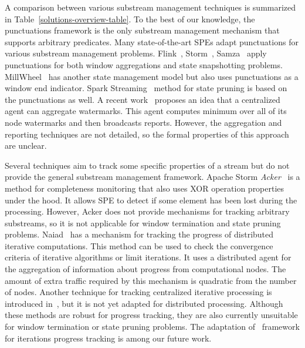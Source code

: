 \label {fs-acker-related}

A comparison between various substream management techniques is summarized in Table~\ref{solutions-overview-table}. To the best of our knowledge, the punctuations framework is the only substream management mechanism that supports arbitrary predicates. Many state-of-the-art SPEs adapt punctuations for various substream management problems. Flink~\cite{Carbone:2017:SMA:3137765.3137777}, Storm~\cite{Toshniwal:2014:STO:2588555.2595641}, Samza~\cite{Noghabi:2017:SSS:3137765.3137770} apply punctuations for both window aggregations and state snapshotting problems. MillWheel~\cite{Akidau:2013:MFS:2536222.2536229} has another state management model but also uses punctuations as a window end indicator. Spark Streaming~\cite{Zaharia:2012:DSE:2342763.2342773} method for state pruning is based on the punctuations as well. A recent work~\cite{DBLP:journals/pvldb/BegoliACHKKMS21} proposes an idea that a centralized agent can aggregate watermarks. This agent computes minimum over all of its node watermarks and then broadcasts reports. However, the aggregation and reporting techniques are not detailed, so the formal properties of this approach are unclear. 

Several techniques aim to track some specific properties of a stream but do not provide the general substream management framework. Apache Storm {\em Acker}~\cite{apache:storm:acker} is a method for completeness monitoring that also uses XOR operation properties under the hood. It allows SPE to detect if some element has been lost during the processing. However, Acker does not provide mechanisms for tracking arbitrary substreams, so it is not applicable for window termination and state pruning problems. Naiad~\cite{Murray:2013:NTD:2517349.2522738} has a mechanism for tracking the progress of distributed iterative computations. This method can be used to check the convergence criteria of iterative algorithms or limit iterations. It uses a distributed agent for the aggregation of information about progress from computational nodes. The amount of extra traffic required by this mechanism is quadratic from the number of nodes. Another technique for tracking centralized iterative processing is introduced in~\cite{chandramouli2014trill}, but it is not yet adapted for distributed processing. Although these methods are robust for progress tracking, they are also currently unsuitable for window termination or state pruning problems. The adaptation of \tracker\ framework for iterations progress tracking is among our future work.

